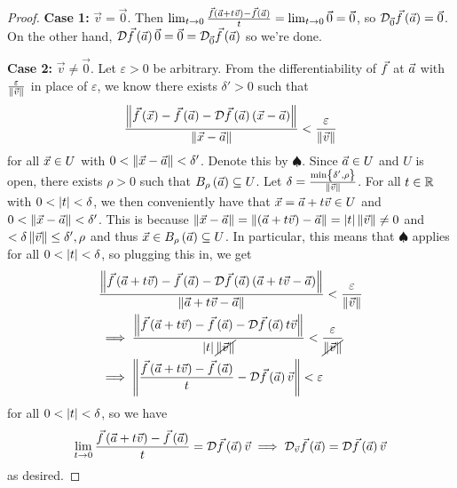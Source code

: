 \documentclass[main.tex]{subfiles}
\begin{document}
\begin{proof}
    \textbf{Case 1:} $\vec{v} = \vec{0}$. Then $\lim_{t\to 0} \frac{\vec{f}\left( \vec{a} + t\vec{v} \right) - \vec{f}\left( \vec{a} \right)}{t} = \lim_{t\to 0} \vec{0} = \vec{0}$, so $\mathcal{D}_{\vec{0}}\vec{f}\left( \vec{a} \right) = \vec{0}$. On the other hand, $\mathcal{D}\vec{f}\left( \vec{a} \right)\vec{0} = \vec{0} = \mathcal{D}_{\vec{0}}\vec{f}\left( \vec{a} \right)$ so we're done.

    \textbf{Case 2:} $\vec{v} \neq \vec{0}$. Let $\varepsilon > 0$ be arbitrary. From the differentiability of $\vec{f}$ at $\vec{a}$ with $\frac{\varepsilon}{\left\lVert \vec{v} \right\rVert}$ in place of $\varepsilon$, we know there exists $\delta' > 0$ such that
    \[\frac{\left\lVert \vec{f}\left( \vec{x} \right) - \vec{f}\left( \vec{a} \right) - \mathcal{D}\vec{f}\left( \vec{a} \right)\left( \vec{x} - \vec{a} \right) \right\rVert}{\left\lVert \vec{x} - \vec{a} \right\rVert} < \frac{\varepsilon}{\left\lVert \vec{v} \right\rVert}\]
    for all $\vec{x}\in U$ with $0 < \left\lVert \vec{x} - \vec{a} \right\rVert < \delta'$. Denote this by $\spadesuit$. Since $\vec{a} \in U$ and $U$ is open, there exists $\rho > 0$ such that $B_\rho\left( \vec{a} \right) \subseteq U$. Let $\delta = \frac{\min\left\{ \delta', \rho \right\}}{\left\lVert \vec{v} \right\rVert}$. For all $t\in \mathbb R$ with $0 < \left\lvert t \right\rvert < \delta$, we then conveniently have that $\vec{x} = \vec{a} + t\vec{v}\in U$ and $0 < \left\lVert \vec{x} - \vec{a} \right\rVert < \delta'$. This is because $\left\lVert \vec{x} - \vec{a} \right\rVert = \left\lVert \left( \vec{a} + t\vec{v} \right) - \vec{a} \right\rVert = \left\lvert t \right\rvert\left\lVert \vec{v} \right\rVert\neq 0$ and $< \delta\left\lVert \vec{v} \right\rVert \le \delta', \rho$ and thus $\vec{x}\in B_\rho\left( \vec{a} \right)\subseteq U$. In particular, this means that $\spadesuit$ applies for all $0 < \left\lvert t \right\rvert < \delta$, so plugging this in, we get
    \begin{align*}
        &\frac{\left\lVert \vec{f}\left( \vec{a} + t\vec{v} \right) - \vec{f}\left( \vec{a} \right) - \mathcal{D}\vec{f}\left( \vec{a} \right)\left( \vec{a} + t\vec{v} - \vec{a} \right) \right\rVert}{\left\lVert \vec{a} + t\vec{v} - \vec{a} \right\rVert} < \frac{\varepsilon}{\left\lVert \vec{v} \right\rVert} \\
        &\implies \frac{\left\lVert \vec{f}\left( \vec{a} + t\vec{v} \right) - \vec{f}\left( \vec{a} \right) - \mathcal{D}\vec{f}\left( \vec{a} \right)t\vec{v} \right\rVert}{\left\lvert t \right\rvert\cancel{\left\lVert \vec{v} \right\rVert}} < \frac{\varepsilon}{\cancel{\left\lVert \vec{v} \right\rVert}} \\
        &\implies \left\lVert \frac{\vec{f}\left( \vec{a} + t\vec{v} \right) - \vec{f}\left( \vec{a} \right)}{t} - \mathcal{D}\vec{f}\left( \vec{a} \right)\vec{v} \right\rVert < \varepsilon
    \end{align*}
    for all $0 < \left\lvert t \right\rvert < \delta$, so we have
    \[\lim_{t\to 0} \frac{\vec{f}\left( \vec{a} + t\vec{v} \right) - \vec{f}\left( \vec{a} \right)}{t} = \mathcal{D}\vec{f}\left( \vec{a} \right)\vec{v} \implies \mathcal{D}_{\vec{v}}\vec{f}\left( \vec{a} \right) = \mathcal{D}\vec{f}\left( \vec{a} \right)\vec{v}\]
    as desired.
\end{proof}
\end{document}
